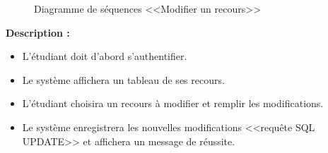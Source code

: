 \documentclass[12pt]{report}
\begin{document}
\newpage

\begin{figure}[h]
\centering
    \centerline{}
    \caption{Diagramme de séquences <<Modifier un recours>>}
\end{figure}

\vspace{0.2in}

\textbf{Description :}

\begin{itemize}
    \item L'étudiant doit d'abord s'authentifier.
    \item Le système affichera un tableau de ses recours.
    \item L'étudiant choisira un recours à modifier et remplir les modifications.
    \item Le système enregistrera les nouvelles modifications <<requête SQL UPDATE>> et affichera un message de réussite.
\end{itemize}
\end{document}
